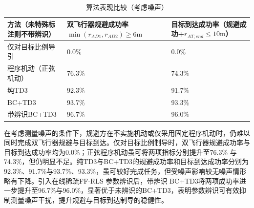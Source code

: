 \begin{table}[htbp]
\centering
\caption{算法表现比较（考虑噪声）}
\label{tab:perf-noise}
\small
\begin{tabularx}{\linewidth}{lXX}
\toprule
方法（未特殊标注则不带辨识） & 双飞行器规避成功率$\min ({r_{AD1}},{r_{AD2}}) \geqslant 6{\text{m}}$ & 目标到达成功率（规避成功+${r_{AT,end}} \leqslant 10{\text{m}}$） \\
\midrule
仅对目标比例导引 & 0.0\% & 0.0\% \\
程序机动（正弦机动） & 76.3\% & 74.3\% \\
纯TD3 & 92.3\% & 91.7\% \\
BC+TD3 & 93.7\% & 93.3\% \\
带辨识BC+TD3 & 96.7\% & 96.0\% \\
\bottomrule
\end{tabularx}
\end{table}
在考虑测量噪声的条件下，规避方在不实施机动或仅采用固定程序机动时，仍难以同时完成双飞行器规避与目标到达。仅对目标比例制导时，双飞行器规避成功率与目标到达成功率均为0.0\%；正弦程序机动虽可将两项指标分别提升至76.3\% 与 74.3\%，但仍明显不足。纯TD3与BC+TD3的规避成功率和目标到达成功率分别为92.3\%、91.7\%与93.7\%、93.3\%，虽可较好完成任务，但受噪声影响较无噪声情形略有下降。引入在线稀疏FF-RLS 参数辨识后，带辨识 BC+TD3将两项成功率进一步提升至96.7\%与96.0\%，显著优于未辨识的BC+TD3，表明参数辨识可有效抑制测量噪声干扰，提升规避与目标到达制导的稳健性。


